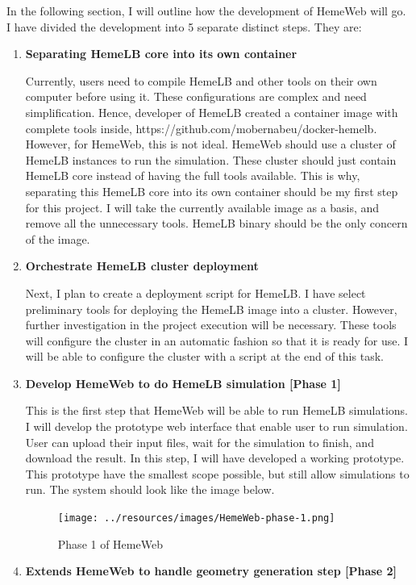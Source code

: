 \documentclass[]{article}
\begin{document}
In the following section, I will outline how the development of HemeWeb
will go. I have divided the development into 5 separate distinct steps.
They are:

\begin{enumerate}
\def\labelenumi{\arabic{enumi}.}
\item
  \textbf{Separating HemeLB core into its own container}

  Currently, users need to compile HemeLB and other tools on their own
  computer before using it. These configurations are complex and need
  simplification. Hence, developer of HemeLB created a container image
  with complete tools inside,
  https://github.com/mobernabeu/docker-hemelb. However, for HemeWeb,
  this is not ideal. HemeWeb should use a cluster of HemeLB instances to
  run the simulation. These cluster should just contain HemeLB core
  instead of having the full tools available. This is why, separating
  this HemeLB core into its own container should be my first step for
  this project. I will take the currently available image as a basis,
  and remove all the unnecessary tools. HemeLB binary should be the only
  concern of the image.
\item
  \textbf{Orchestrate HemeLB cluster deployment}

  Next, I plan to create a deployment script for HemeLB. I have select
  preliminary tools for deploying the HemeLB image into a cluster.
  However, further investigation in the project execution will be
  necessary. These tools will configure the cluster in an automatic
  fashion so that it is ready for use. I will be able to configure the
  cluster with a script at the end of this task.
\item
  \textbf{Develop HemeWeb to do HemeLB simulation {[}Phase 1{]}}

  This is the first step that HemeWeb will be able to run HemeLB
  simulations. I will develop the prototype web interface that enable
  user to run simulation. User can upload their input files, wait for
  the simulation to finish, and download the result. In this step, I
  will have developed a working prototype. This prototype have the
  smallest scope possible, but still allow simulations to run. The
  system should look like the image below.

  \begin{figure}[H]
  \centering
  \texttt{[image: ../resources/images/HemeWeb-phase-1.png]}
  \caption{Phase 1 of HemeWeb}
  \end{figure}
\item
  \textbf{Extends HemeWeb to handle geometry generation step {[}Phase
  2{]}}


\end{enumerate}
\end{document}

